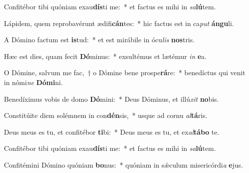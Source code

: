 \item Confitébor tibi quóniam exau\textbf{dís}ti me:~* et factus es mihi in \textit{sa}\textbf{lú}tem.
\item Lápidem, quem reprobavérunt ædifi\textbf{cán}tes:~* hic factus est in ca\textit{put} \textbf{án}\textbf{gu}li.
\item A Dómino factum est \textbf{is}tud:~* et est mirábile in ócu\textit{lis} \textbf{nos}tris.
\item Hæc est dies, quam fecit \textbf{Dó}minus:~* exsultémus et lætémur \textit{in} \textbf{e}a.
\item O Dómine, salvum me fac,~† o Dómine bene prospe\textbf{rá}re:~* benedíctus qui venit in nómi\textit{ne} \textbf{Dó}\textbf{mi}ni.
\item Benedíximus vobis de domo \textbf{Dó}mini:~* Deus Dóminus, et illú\textit{xit} \textbf{no}bis.
\item Constitúite diem solémnem in con\textbf{dén}sis,~* usque ad cornu \textit{al}\textbf{tá}ris.
\item Deus meus es tu, et confitébor \textbf{ti}bi:~* Deus meus es tu, et ex\textit{al}\textbf{tá}\textbf{bo} te.
\item Confitébor tibi quóniam exau\textbf{dís}ti me:~* et factus es mihi in \textit{sa}\textbf{lú}tem.
\item Confitémini Dómino quóniam \textbf{bo}nus:~* quóniam in sǽculum misericórdi\textit{a} \textbf{e}jus.
